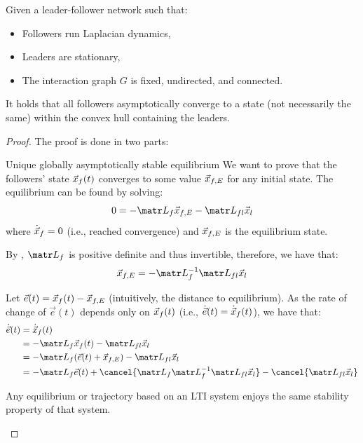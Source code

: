 \begin{theorem}[Containment] \label{th:containment_optimality}
    Given a leader-follower network such that:
    \begin{itemize}
        \item Followers run Laplacian dynamics,
        \item Leaders are stationary,
        \item The interaction graph $G$ is fixed, undirected, and connected.
    \end{itemize}
    It holds that all followers asymptotically converge to a state (not necessarily the same) within the convex hull containing the leaders.

    \begin{proof}
        The proof is done in two parts:
        \begin{descriptionlist}
            \item[Unique globally asymptotically stable equilibrium] 
                We want to prove that the followers' state ${\vec{x}}_f(t)$ converges to some value ${\vec{x}}_{f,E}$ for any initial state. The equilibrium can be found by solving:
                \[ 0 = -\lap_f \x_{f,E} - \lap_{fl} \x_l \]
                where $\dot{{\vec{x}}}_f = 0$ (i.e., reached convergence) and ${\vec{x}}_{f,E}$ is the equilibrium state.

                By , $\lap_f$ is positive definite and thus invertible, therefore, we have that:
                \[  \x_{f,E} = -\lap_f^{-1} \lap_{fl} \x_l \]

                Let $\vec{e}(t) = {\vec{x}}_f(t) - {\vec{x}}_{f,E}$ (intuitively, the distance to equilibrium). As the rate of change of $\vec{e}(t)$ depends only on ${\vec{x}}_f(t)$ (i.e., $\dot{\vec{e}}(t) = \dot{{\vec{x}}}_f(t)$), we have that:
                \[
                    \begin{split}
                        \dot{\vec{e}}(t) &= \dot{\x}_f(t) \\
                            &= -\lap_f \x_f(t) - \lap_{fl} \x_l \\
                            &= -\lap_f (\vec{e}(t) + \x_{f,E}) - \lap_{fl} \x_l \\
                            &= -\lap_f \vec{e}(t) + \cancel{\lap_f \lap_f^{-1} \lap_{fl} \x_l} - \cancel{\lap_{fl} \x_l} \\
                    \end{split}
                \]
                
                \begin{lemma} \label{th:lti_stability_equilib_traj}
                    Any equilibrium or trajectory based on an LTI system enjoys the same stability property of that system.
                \end{lemma}


\end{descriptionlist}
\end{proof}
\end{theorem}
